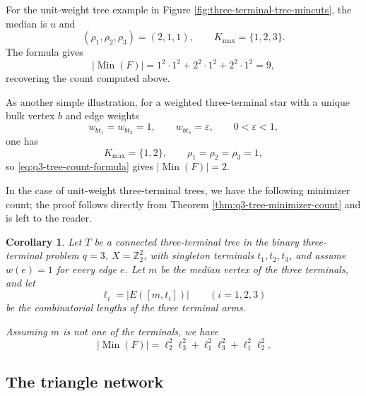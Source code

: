 \documentclass[11pt,oneside,letterpaper]{article}
\numberwithin{equation}{section}
\newtheorem{corollary}[theorem]{Corollary}
\theoremstyle{definition}
\theoremstyle{remark}
\begin{document}
For the unit-weight tree example in Figure \ref{fig:three-terminal-tree-mincuts}, the median is $u$ and
\begin{equation}
  (\rho_1,\rho_2,\rho_3)=(2,1,1),\qquad
  K_{\max}=\{1,2,3\}.
\end{equation}
The formula gives
\begin{equation}
  |\operatorname{Min}(F)|
  =
  1^2\cdot 1^2
  +2^2\cdot 1^2
  +2^2\cdot 1^2
  =9,
\end{equation}
recovering the count computed above.

As another simple illustration, for a weighted three-terminal star with a unique bulk vertex $b$ and edge weights
\begin{equation}
  w_{b t_1}=w_{b t_2}=1,\qquad w_{b t_3}=\varepsilon,\qquad 0<\varepsilon<1,
\end{equation}
one has
\begin{equation}
  K_{\max}=\{1,2\},\qquad
  \rho_1=\rho_2=\rho_3=1,
\end{equation}
so \eqref{eq:q3-tree-count-formula} gives
\(|\operatorname{Min}(F)|=2\).


In the case of unit-weight three-terminal trees, we have the following minimizer count; the proof follows directly from Theorem \ref{thm:q3-tree-minimizer-count} and is left to the reader.

\begin{corollary}
  \label{cor:unit-weight-q3-tree-minimizer-count}
  Let $T$ be a connected three-terminal tree in the binary
  three-terminal problem $q=3$, $X=\mathbb{Z}_2^2$, with singleton terminals $t_1,t_2,t_3$, and assume $w(e)=1$ for every edge $e$. Let $m$ be the median vertex of the three terminals, and let
  \begin{equation}
    \ell_i=|E([m,t_i])|\qquad (i=1,2,3)
  \end{equation}
  be the combinatorial lengths of the three terminal arms.

  Assuming $m$ is not one of the terminals, we have
  \begin{equation}
    \label{eq:unit-weight-q3-tree-count}
    |\operatorname{Min}(F)|
    =
    \ell_2^2\ell_3^2
    +\ell_1^2\ell_3^2
    +\ell_1^2\ell_2^2.
  \end{equation}
\end{corollary}

\subsection{The triangle network}
\end{document}
